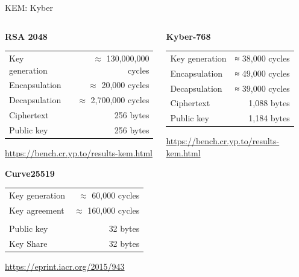 \documentclass[xcolor=table,10pt,aspectratio=169]{beamer}
\begin{document}
\begin{frame}[label={sec:org88a07d3}]{KEM: Kyber}
\begin{columns}[t]
\begin{column}{0.5\columnwidth}
\textbf{RSA 2048}

\begin{center}
\begin{tabular}{lr}
\toprule
Key generation & \(\approx\) 130,000,000 cycles\\[0pt]
Encapsulation & \(\approx\) 20,000 cycles\\[0pt]
Decapsulation & \(\approx\) 2,700,000 cycles\\[0pt]
Ciphertext & 256 bytes\\[0pt]
Public key & 256 bytes\\[0pt]
\bottomrule
\end{tabular}

\end{center}

{\tiny \url{https://bench.cr.yp.to/results-kem.html} }

\textbf{Curve25519}

\begin{center}
\begin{tabular}{lr}
\toprule
Key generation & \(\approx\) 60,000 cycles\\[0pt]
Key agreement & \(\approx\) 160,000 cycles\\[0pt]
 & \\[0pt]
Public key & 32 bytes\\[0pt]
Key Share & 32 bytes\\[0pt]
\bottomrule
\end{tabular}

\end{center}

\tiny \url{https://eprint.iacr.org/2015/943}
\end{column}

\begin{column}{0.5\columnwidth}
\textbf{Kyber-768}

\begin{center}
\begin{tabular}{lr}
\toprule
Key generation & ≈  38,000 cycles\\[0pt]
Encapsulation & ≈  49,000 cycles\\[0pt]
Decapsulation & ≈  39,000 cycles\\[0pt]
Ciphertext & 1,088 bytes\\[0pt]
Public key & 1,184 bytes\\[0pt]
\bottomrule
\end{tabular}

\end{center}

\tiny \url{https://bench.cr.yp.to/results-kem.html}
\end{column}
\end{columns}
\end{frame}
\end{document}
